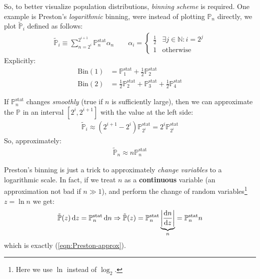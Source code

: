 \documentclass[../../main.tex]{subfiles}
\begin{document}
\medskip

So, to better visualize population distributions, \textit{binning scheme} is required. One example is Preston's \textit{logarithmic} binning, were instead of plotting $\mathbb{P}_n$ directly, we plot $\tilde{\mathbb{P}}_i$ defined as follows:
\begin{align*}
    \tilde{\mathbb{P}}_i \equiv \sum_{n=2^i}^{2^{i+1}} \mathbb{P}_{n}^{\mathrm{stat}} \alpha_n \qquad \alpha_i = \begin{cases}
        \frac{1}{2} & \exists j \in \mathbb{N} \colon i = 2^j\\
        1 & \text{otherwise}
    \end{cases}
\end{align*}
Explicitly:
\begin{align*}
    \mathrm{Bin}(1) &= \mathbb{P}_{1}^{\mathrm{stat}} + \frac{1}{2} \mathbb{P}_2^{\mathrm{stat}} \\
    \mathrm{Bin}(2) &= \frac{1}{2} \mathbb{P}_2^{\mathrm{stat}} + \mathbb{P}_3^{\mathrm{stat}} + \frac{1}{2} \mathbb{P}_4^{\mathrm{stat}}  
\end{align*}

If $\mathbb{P}_n^{\mathrm{stat}}$ changes \textit{smoothly} (true if $n$ is sufficiently large), then we can approximate the $\mathbb{P}$ in an interval $[2^i, 2^{i+1}]$ with the value at the left side:
\begin{align*}
    \tilde{\mathbb{P}}_i \approx (2^{i+1} - 2^{i}) \mathbb{P}_{2^i}^{\mathrm{stat}} = 2^i \mathbb{P}_{2^i}^{\mathrm{stat}}
\end{align*}
So, approximately:
\begin{align}\label{eqn:Preston-approx}
    \tilde{\mathbb{P}}_n \approx n \mathbb{P}_n^{\mathrm{stat}}
\end{align}

Preston's binning is just a trick to approximately \textit{change variables} to a logarithmic scale. In fact, if we treat $n$ as a \textbf{continuous} variable (an approximation not bad if $n \gg 1$), and perform the change of random variables\footnote{Here we use $\ln$ instead of $\log_2$.} $z = \ln n$ we get:
\begin{align}\label{eqn:logscalebin}
    \tilde{\mathbb{P}}(z) \dd{z} = \mathbb{P}_n^{\mathrm{stat}}\dd{n} \Rightarrow \tilde{\mathbb{P}}(z) = \mathbb{P}_n^{\mathrm{stat}} \underbrace{\left|\dv{n}{z}\right|}_{n}  = \mathbb{P}_n^{\mathrm{stat}}n
\end{align}
which is exactly (\ref{eqn:Preston-approx}).
\end{document}
